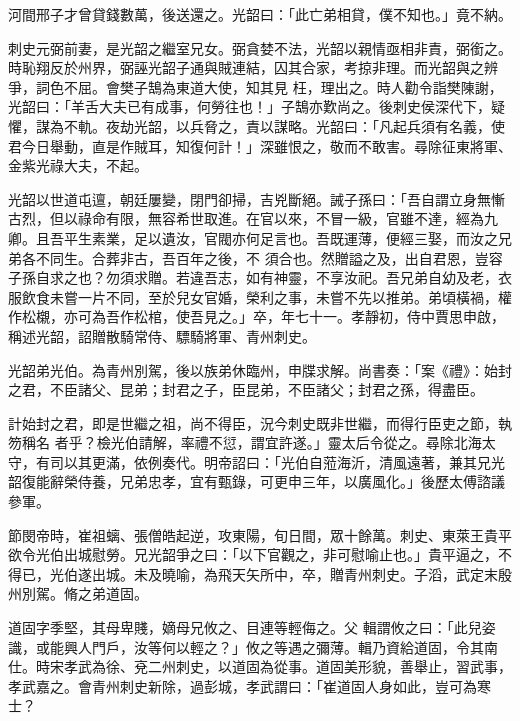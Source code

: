 \begin{pinyinscope}
 河間邢子才曾貸錢數萬，後送還之。光韶曰：「此亡弟相貸，僕不知也。」竟不納。



 刺史元弼前妻，是光韶之繼室兄女。弼貪婪不法，光韶以親情亟相非責，弼銜之。時恥翔反於州界，弼誣光韶子通與賊連結，囚其合家，考掠非理。而光韶與之辨爭，詞色不屈。會樊子鵠為東道大使，知其見
 枉，理出之。時人勸令詣樊陳謝，光韶曰：「羊舌大夫已有成事，何勞往也！」子鵠亦歎尚之。後刺史侯深代下，疑懼，謀為不軌。夜劫光韶，以兵脅之，責以謀略。光韶曰：「凡起兵須有名義，使君今日舉動，直是作賊耳，知復何計！」深雖恨之，敬而不敢害。尋除征東將軍、金紫光祿大夫，不起。



 光韶以世道屯邅，朝廷屢變，閉門卻掃，吉兇斷絕。誡子孫曰：「吾自謂立身無慚古烈，但以祿命有限，無容希世取進。在官以來，不冒一級，官雖不達，經為九卿。且吾平生素業，足以遺汝，官閥亦何足言也。吾既運薄，便經三娶，而汝之兄弟各不同生。合葬非古，吾百年之後，不
 須合也。然贈謚之及，出自君恩，豈容子孫自求之也？勿須求贈。若違吾志，如有神靈，不享汝祀。吾兄弟自幼及老，衣服飲食未嘗一片不同，至於兒女官婚，榮利之事，未嘗不先以推弟。弟頃橫禍，權作松櫬，亦可為吾作松棺，使吾見之。」卒，年七十一。孝靜初，侍中賈思申啟，稱述光韶，詔贈散騎常侍、驃騎將軍、青州刺史。



 光韶弟光伯。為青州別駕，後以族弟休臨州，申牒求解。尚書奏：「案《禮》：始封之君，不臣諸父、昆弟；封君之子，臣昆弟，不臣諸父；封君之孫，得盡臣。



 計始封之君，即是世繼之祖，尚不得臣，況今刺史既非世繼，而得行臣吏之節，執笏稱名
 者乎？檢光伯請解，率禮不愆，謂宜許遂。」靈太后令從之。尋除北海太守，有司以其更滿，依例奏代。明帝詔曰：「光伯自蒞海沂，清風遠著，兼其兄光韶復能辭榮侍養，兄弟忠孝，宜有甄錄，可更申三年，以廣風化。」後歷太傅諮議參軍。



 節閔帝時，崔祖螭、張僧皓起逆，攻東陽，旬日間，眾十餘萬。刺史、東萊王貴平欲令光伯出城慰勞。兄光韶爭之曰：「以下官觀之，非可慰喻止也。」貴平逼之，不得已，光伯遂出城。未及曉喻，為飛天矢所中，卒，贈青州刺史。子滔，武定末殷州別駕。脩之弟道固。



 道固字季堅，其母卑賤，嫡母兄攸之、目連等輕侮之。父
 輯謂攸之曰：「此兒姿識，或能興人門戶，汝等何以輕之？」攸之等遇之彌薄。輯乃資給道固，令其南仕。時宋孝武為徐、兗二州刺史，以道固為從事。道固美形貌，善舉止，習武事，孝武嘉之。會青州刺史新除，過彭城，孝武謂曰：「崔道固人身如此，豈可為寒士？




\end{pinyinscope}
